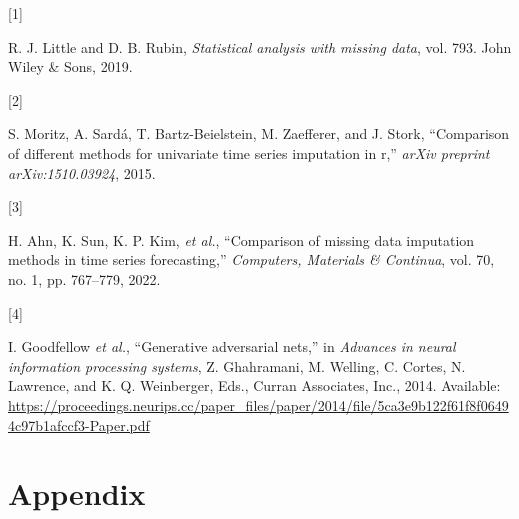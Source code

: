 \documentclass[
]{report}
\newlength{\cslhangindent}
\newlength{\csllabelwidth}
\newlength{\cslentryspacingunit} %
\newenvironment{CSLReferences}[2] %
 {%
  \setlength{\parindent}{0pt}
  \ifodd #1
  \let\oldpar\par
  \def\par{\hangindent=\cslhangindent\oldpar}
  \fi
  \setlength{\parskip}{#2\cslentryspacingunit}
 }%
 {}
\newcommand{\CSLLeftMargin}[1]{\parbox[t]{\csllabelwidth}{#1}}
\newcommand{\CSLRightInline}[1]{\parbox[t]{\linewidth - \csllabelwidth}{#1}\break}
\begin{document}
\hypertarget{refs}{}
\begin{CSLReferences}{0}{0}
\leavevmode{}%
\CSLLeftMargin{{[}1{]} }%
\CSLRightInline{R. J. Little and D. B. Rubin, \emph{Statistical analysis
with missing data}, vol. 793. John Wiley \& Sons, 2019.}

\leavevmode{}%
\CSLLeftMargin{{[}2{]} }%
\CSLRightInline{S. Moritz, A. Sardá, T. Bartz-Beielstein, M. Zaefferer,
and J. Stork, {``Comparison of different methods for univariate time
series imputation in r,''} \emph{arXiv preprint arXiv:1510.03924},
2015.}

\leavevmode{}%
\CSLLeftMargin{{[}3{]} }%
\CSLRightInline{H. Ahn, K. Sun, K. P. Kim, \emph{et al.}, {``Comparison
of missing data imputation methods in time series forecasting,''}
\emph{Computers, Materials \& Continua}, vol. 70, no. 1, pp. 767--779,
2022.}

\leavevmode{}%
\CSLLeftMargin{{[}4{]} }%
\CSLRightInline{I. Goodfellow \emph{et al.}, {``Generative adversarial
nets,''} in \emph{Advances in neural information processing systems}, Z.
Ghahramani, M. Welling, C. Cortes, N. Lawrence, and K. Q. Weinberger,
Eds., Curran Associates, Inc., 2014. Available:
\url{https://proceedings.neurips.cc/paper_files/paper/2014/file/5ca3e9b122f61f8f06494c97b1afccf3-Paper.pdf}}

\end{CSLReferences}

\hypertarget{appendix}{%
\chapter{Appendix}\label{appendix}}
\end{document}
